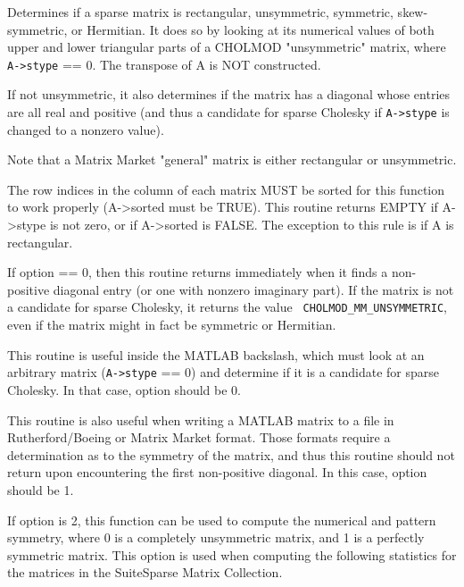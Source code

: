 \documentclass[11pt]{article}
\begin{document}

Determines if a sparse matrix is rectangular, unsymmetric, symmetric,
skew-symmetric, or Hermitian.  It does so by looking at its numerical values
of both upper and lower triangular parts of a CHOLMOD "unsymmetric"
matrix, where \verb'A->stype' == 0.  The transpose of A is NOT constructed.

If not unsymmetric, it also determines if the matrix has a diagonal whose
entries are all real and positive (and thus a candidate for sparse Cholesky
if \verb'A->stype' is changed to a nonzero value).

Note that a Matrix Market "general" matrix is either rectangular or
unsymmetric.

The row indices in the column of each matrix MUST be sorted for this function
to work properly (A->sorted must be TRUE).  This routine returns EMPTY if
A->stype is not zero, or if A->sorted is FALSE.  The exception to this rule
is if A is rectangular.

If option == 0, then this routine returns immediately when it finds a
non-positive diagonal entry (or one with nonzero imaginary part).   If the
matrix is not a candidate for sparse Cholesky, it returns the value {\tt
CHOLMOD\_MM\_UNSYMMETRIC}, even if the matrix might in fact be symmetric or
Hermitian.

This routine is useful inside the MATLAB backslash, which must look at an
arbitrary matrix (\verb'A->stype' == 0) and determine if it is a candidate for
sparse Cholesky.  In that case, option should be 0.

This routine is also useful when writing a MATLAB matrix to a file in
Rutherford/Boeing or Matrix Market format.  Those formats require a
determination as to the symmetry of the matrix, and thus this routine should
not return upon encountering the first non-positive diagonal.  In this case,
option should be 1.

If option is 2, this function can be used to compute the numerical and
pattern symmetry, where 0 is a completely unsymmetric matrix, and 1 is a
perfectly symmetric matrix.  This option is used when computing the following
statistics for the matrices in the SuiteSparse Matrix Collection.
\end{document}

